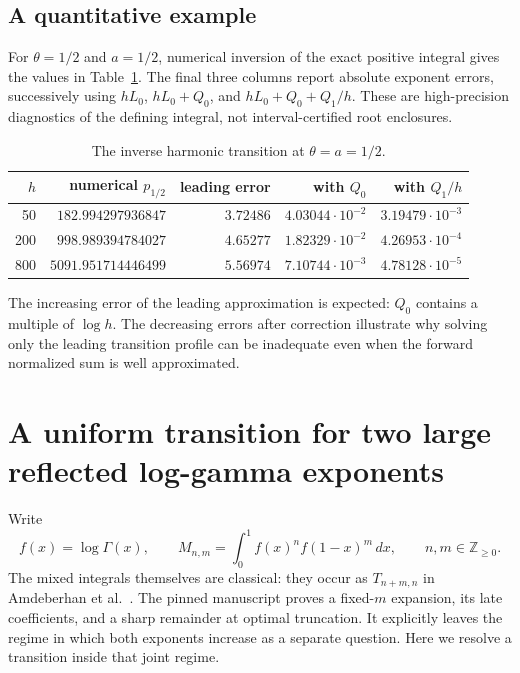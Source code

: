 \documentclass[11pt,a4paper]{article}
\numberwithin{equation}{section}
\theoremstyle{plain}
\theoremstyle{definition}
\theoremstyle{remark}
\begin{document}
\subsection{A quantitative example}

For $\theta=1/2$ and $a=1/2$, numerical inversion of the exact
positive integral gives the values in Table~\ref{us:tab:inverse}.
The final three columns report absolute exponent errors, successively
using $hL_0$, $hL_0+Q_0$, and $hL_0+Q_0+Q_1/h$.
These are high-precision diagnostics of the defining integral,
not interval-certified root enclosures.

\begin{table}[htbp]
\centering
\caption{The inverse harmonic transition at $\theta=a=1/2$.}
\label{us:tab:inverse}
\begin{tabular}{@{}rrrrr@{}}
\toprule
$h$ & numerical $p_{1/2}$ & leading error & with $Q_0$ & with $Q_1/h$\\
\midrule
50 & $182.994297936847$ & $3.72486$ & $4.03044\cdot10^{-2}$ & $3.19479\cdot10^{-3}$\\
200 & $998.989394784027$ & $4.65277$ & $1.82329\cdot10^{-2}$ & $4.26953\cdot10^{-4}$\\
800 & $5091.951714446499$ & $5.56974$ & $7.10744\cdot10^{-3}$ & $4.78128\cdot10^{-5}$\\
\bottomrule
\end{tabular}
\end{table}

The increasing error of the leading approximation is expected:
$Q_0$ contains a multiple of $\log h$. The decreasing errors after
correction illustrate why solving only the leading transition profile
can be inadequate even when the forward normalized sum is well
approximated.


\section{A uniform transition for two large reflected log-gamma exponents}
\label{joint:sec:moments}

Write
\[
 f(x)=\log\Gamma(x),\qquad
 M_{n,m}=\int_0^1 f(x)^n f(1-x)^m\,dx,
 \qquad n,m\in\mathbb Z_{\geq0}.
\]
The mixed integrals themselves are classical: they occur as
$T_{n+m,n}$ in Amdeberhan et al.\ \cite[Section~5]{gaussian:ACEMKM}.
The pinned manuscript proves a fixed-$m$ expansion, its late coefficients,
and a sharp remainder at optimal truncation. It explicitly leaves the
regime in which both exponents increase as a separate question.
Here we resolve a transition inside that joint regime.
\end{document}
